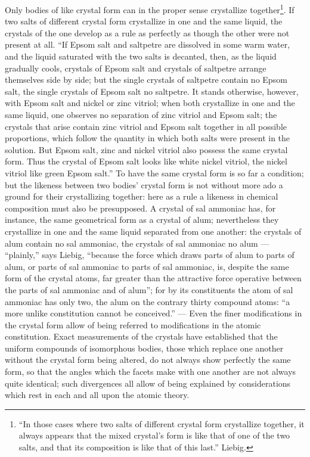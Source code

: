 \documentclass[12pt,a4paper]{book}
\begin{document}
Only bodies of like crystal form can in the proper sense crystallize
together\footnote{``In those cases where two salts of different crystal form
crystallize together, it always appears that the mixed crystal's form is like
that of one of the two salts, and that its composition is like that of this
last.'' Liebig.}. If two salts of different crystal form crystallize in one and
the same liquid, the crystals of the one develop as a rule as perfectly as
though the other were not present at all. ``If Epsom salt and saltpetre are
dissolved in some warm water, and the liquid saturated with the two salts is
decanted, then, as the liquid gradually
cools, crystals of Epsom salt and crystals of saltpetre arrange themselves side
by side; but the single crystals of saltpetre contain no Epsom salt, the single
crystals of Epsom salt no saltpetre. It stands otherwise, however, with Epsom
salt and nickel or zinc vitriol; when both crystallize in one and the same
liquid, one observes no separation of zinc vitriol and Epsom salt; the crystals
that arise contain zinc vitriol and Epsom salt together in all possible
proportions, which follow the quantity in which both salts were present in the
solution. But Epsom salt, zinc and nickel vitriol also possess the same crystal
form. Thus the crystal of Epsom salt looks like white nickel vitriol, the
nickel vitriol like green Epsom salt.'' To have the same crystal form is so far
a condition; but the likeness between two bodies' crystal form is not without
more ado a ground for their crystallizing together: here as a rule a likeness
in chemical composition must also be presupposed. A crystal of sal ammoniac
has, for instance, the same geometrical form as a crystal of alum; nevertheless
they crystallize in one and the same liquid separated from one another: the
crystals of alum contain no sal ammoniac, the crystals of sal ammoniac no alum
--- ``plainly,'' says Liebig, ``because the force which draws parts of alum to
parts of alum, or parts of sal ammoniac to parts of sal ammoniac, is, despite
the same form of the crystal atoms, far greater than the attractive force
operative between the parts of sal ammoniac and of alum''; for by its
constituents the atom of sal ammoniac has only two, the alum on the contrary
thirty compound atoms: ``a more unlike constitution cannot be conceived.'' ---
Even the finer modifications in the crystal form allow of being referred to
modifications in the atomic constitution. Exact measurements of the crystals
have established that the uniform compounds of isomorphous bodies, those which
replace one another without the crystal form being altered, do not always show
perfectly the same form, so that the angles which the facets make with one
another are not always quite identical; such divergences all allow of being
explained by considerations which rest in each and all
\setcounter{footnote}{0}
upon the atomic theory.
\end{document}
